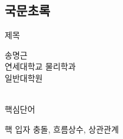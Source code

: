 
\begin{CJK}{UTF8}{}
\begin{Korean}

{\fontsize{11pt}{18pt} \thispagestyle{empty}
 \selectfont
 \clearpage 
{} 

\chapter*{\textnormal{국문초록}}

\begin{center}
{\LARGE 제목}
\end{center}
\begin{flushright}
\parbox[t]{0.9\textwidth}
{\begin{flushright}
송명근 \\ 연세대학교 물리학과\\
일반대학원\\
\end{flushright}}
\end{flushright}
\vspace{1em}



 \noindent
\hrulefill\\
{핵심단어 }
\parbox[t]{0.8\textwidth}
{핵 입자 충돌, 흐름상수, 상관관계}

\thispagestyle{empty}}
\end{Korean}
\end{CJK}


